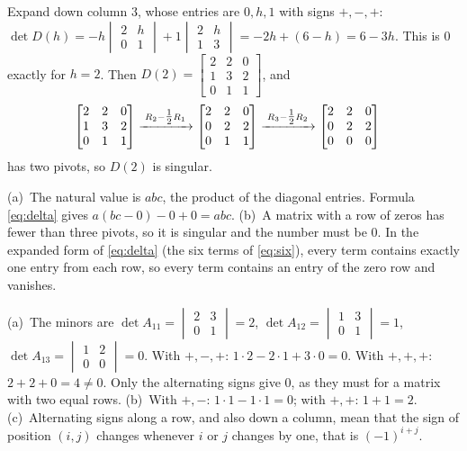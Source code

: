 \documentclass[11pt]{article}
\begin{document}
\begin{description}[leftmargin=0pt,itemsep=5pt]
  \item[Knowledge Check \ref{kc:param}.] Expand down column $3$, whose entries are $0,h,1$ with signs $+,-,+$: $\det D(h)=-h\begin{vmatrix}2&h\\0&1\end{vmatrix}+1\begin{vmatrix}2&h\\1&3\end{vmatrix}=-2h+(6-h)=6-3h$. This is $0$ exactly for $h=2$. Then $D(2)=\begin{bmatrix}2&2&0\\1&3&2\\0&1&1\end{bmatrix}$, and
  \begin{align*}
  \begin{bmatrix}2&2&0\\1&3&2\\0&1&1\end{bmatrix}
  &\xrightarrow{\;R_2-\tfrac12R_1\;}
  \begin{bmatrix}2&2&0\\0&2&2\\0&1&1\end{bmatrix}
  \xrightarrow{\;R_3-\tfrac12R_2\;}
  \begin{bmatrix}2&2&0\\0&2&2\\0&0&0\end{bmatrix}
  \end{align*}
  has two pivots, so $D(2)$ is singular.
  \item[Pause and think \ref{think:numberwant}.] (a)~The natural value is $abc$, the product of the diagonal entries. Formula \eqref{eq:delta} gives $a(bc-0)-0+0=abc$. (b)~A matrix with a row of zeros has fewer than three pivots, so it is singular and the number must be $0$. In the expanded form of \eqref{eq:delta} (the six terms of \eqref{eq:six}), every term contains exactly one entry from each row, so every term contains an entry of the zero row and vanishes.
  \item[Pause and think \ref{think:signs}.] (a)~The minors are $\det A_{11}=\begin{vmatrix}2&3\\0&1\end{vmatrix}=2$, $\det A_{12}=\begin{vmatrix}1&3\\0&1\end{vmatrix}=1$, $\det A_{13}=\begin{vmatrix}1&2\\0&0\end{vmatrix}=0$. With $+,-,+$: $1\cdot2-2\cdot1+3\cdot0=0$. With $+,+,+$: $2+2+0=4\neq0$. Only the alternating signs give $0$, as they must for a matrix with two equal rows. (b)~With $+,-$: $1\cdot1-1\cdot1=0$; with $+,+$: $1+1=2$. (c)~Alternating signs along a row, and also down a column, mean that the sign of position $(i,j)$ changes whenever $i$ or $j$ changes by one, that is $(-1)^{i+j}$.

\end{description}
\end{document}
